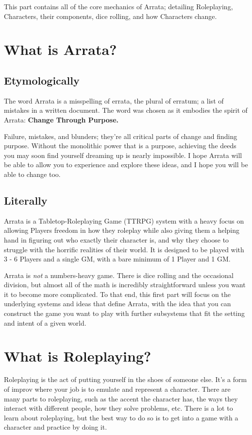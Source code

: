 \documentclass[../main.tex]{subfiles}
\begin{document}
    This part contains all of the core mechanics of Arrata; detailing Roleplaying, Characters, their components, dice rolling, and how Characters change.

    \section{What is Arrata?}

    \subsection{Etymologically}
    The word Arrata is a misspelling of errata, the plural of erratum; a list of mistakes in a written document. The word was chosen as it embodies the spirit of Arrata: \textbf{Change Through Purpose.}

    Failure, mistakes, and blunders; they're all critical parts of change and finding purpose. Without the monolithic power that is a purpose, achieving the deeds you may soon find yourself dreaming up is nearly impossible. I hope Arrata will be able to allow you to experience and explore these ideas, and I hope you will be able to change too.
    
    \subsection{Literally}
    Arrata is a Tabletop-Roleplaying Game (TTRPG) system with a heavy focus on allowing Players freedom in how they roleplay while also giving them a helping hand in figuring out who exactly their character is, and why they choose to struggle with the horrific realities of their world. It is designed to be played with 3 - 6 Players and a single GM, with a bare minimum of 1 Player and 1 GM.

    Arrata is {\em not} a numbers-heavy game. There is dice rolling and the occasional division, but almost all of the math is incredibly straightforward unless you want it to become more complicated. To that end, this first part will focus on the underlying systems and ideas that define Arrata, with the idea that you can construct the game you want to play with further subsystems that fit the setting and intent of a given world.
    

    \section{What is Roleplaying?}

    Roleplaying is the act of putting yourself in the shoes of someone else. It's a form of improv where your job is to emulate and represent a character. There are many parts to roleplaying, such as the accent the character has, the ways they interact with different people, how they solve problems, etc. There is a lot to learn about roleplaying, but the best way to do so is to get into a game with a character and practice by doing it.
\end{document}
